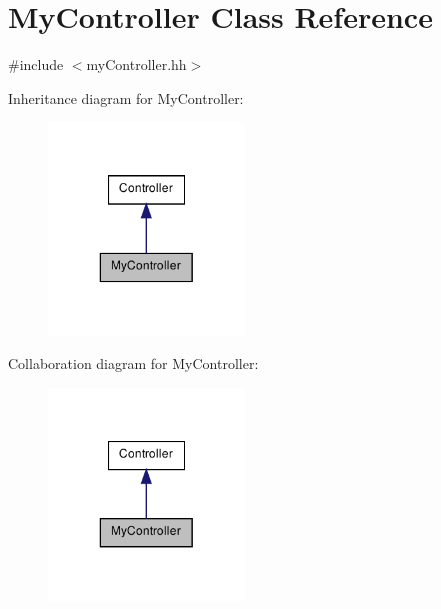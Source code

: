 \hypertarget{class_my_controller}{
\section{MyController Class Reference}
\label{class_my_controller}
}


{\ttfamily \#include $<$myController.hh$>$}



Inheritance diagram for MyController:\nopagebreak
\begin{figure}[H]
\begin{center}
\leavevmode
\includegraphics[width=148pt]{class_my_controller__inherit__graph}
\end{center}
\end{figure}


Collaboration diagram for MyController:\nopagebreak
\begin{figure}[H]
\begin{center}
\leavevmode
\includegraphics[width=148pt]{class_my_controller__coll__graph}
\end{center}
\end{figure}
